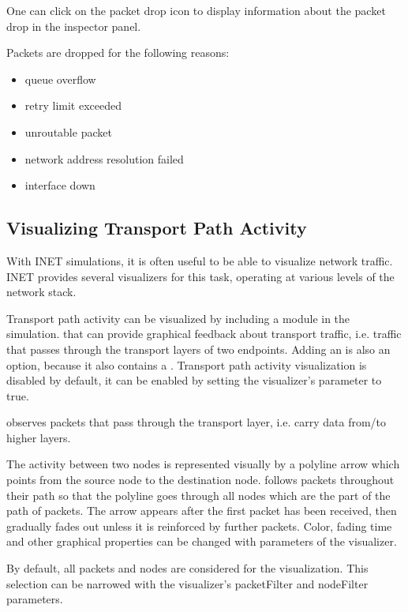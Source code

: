 One can click on the packet drop icon to display information about the packet
drop in the inspector panel.

Packets are dropped for the following reasons:

\begin{itemize}
  \item queue overflow
  \item retry limit exceeded
  \item unroutable packet
  \item network address resolution failed
  \item interface down
\end{itemize}


\subsection{Visualizing Transport Path Activity}
\label{sec:visualization:transport-path-activity}

With INET simulations, it is often useful to be able to visualize network
traffic. INET provides several visualizers for this task, operating at various
levels of the network stack.

Transport path activity can be visualized by including a
 module in the simulation. 
that can provide graphical feedback about transport traffic, i.e. traffic that passes
through the transport layers of two endpoints. Adding an  is
also an option, because it also contains a . Transport
path activity visualization is disabled by default, it can be enabled by setting
the visualizer's  parameter to true.

 observes packets that pass through the transport layer,
i.e. carry data from/to higher layers.

The activity between two nodes is represented visually by a polyline arrow which
points from the source node to the destination node. 
follows packets throughout their path so that the polyline goes through all
nodes which are the part of the path of packets. The arrow appears after the
first packet has been received, then gradually fades out unless it is reinforced
by further packets. Color, fading time and other graphical properties can be
changed with parameters of the visualizer.

By default, all packets and nodes are considered for the visualization. This
selection can be narrowed with the visualizer's packetFilter and nodeFilter
parameters.

